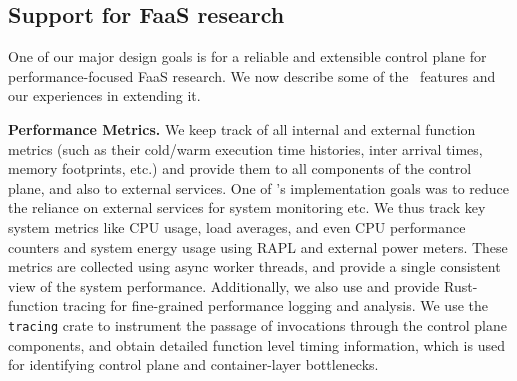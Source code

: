 


\subsection{Support for FaaS research}
\label{sec:impl:support}

One of our major design goals is for a reliable and extensible control plane for performance-focused FaaS research.
We now describe some of the \sysname~features and our experiences in extending it.


\noindent \textbf{Performance Metrics.}
We keep track of all internal and external function metrics (such as their cold/warm execution time histories, inter arrival times, memory footprints, etc.) and provide them to all components of the control plane, and also to external services.
%
One of \sysname's implementation goals was to reduce the reliance on external services for system monitoring etc.
We thus track key system metrics like CPU usage, load averages, and even CPU performance counters and system energy usage using RAPL and external power meters.
These metrics are collected using async worker threads, and provide a single consistent view of the system performance.
%
Additionally, we also use and provide Rust-function tracing for fine-grained performance logging and analysis.
We use the \texttt{tracing} crate to instrument the passage of invocations through the control plane components, and obtain detailed function level timing information, which is used for identifying control plane and container-layer bottlenecks. 

